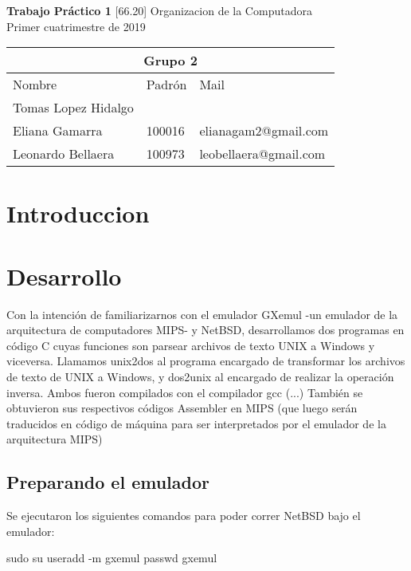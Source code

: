 \documentclass[titlepage,a4paper]{article}
\begin{document}
\begin{titlepage} %
    \centering
    \vfill
    \Huge \textbf{Trabajo Práctico 1}
    \vskip2cm
    \Large [66.20] Organizacion de la Computadora\\
    Primer cuatrimestre de 2019 
    \vskip2cm
    \begin{table}[htbp]
	\begin{center}
	\begin{tabular}{|l|l|l|}
	\hline
    \multicolumn{3}{|c|}{Grupo 2} \\ \hline
	Nombre & Padrón & Mail \\ \hline 
    Tomas Lopez Hidalgo & & \\ \hline 
    Eliana Gamarra & 100016 & elianagam2@gmail.com\\ \hline
    Leonardo Bellaera &  100973 & leobellaera@gmail.com \\ \hline
    \end{tabular}
	\label{tabla:sencilla}
	\end{center}
	\end{table}

    \vfill
\end{titlepage}
\tableofcontents %
\newpage

\section{Introduccion}\label{sec:intro}


\section{Desarrollo}\label{sec:intro}
Con la intención de familiarizarnos con el emulador GXemul -un emulador de la arquitectura de computadores MIPS- y NetBSD, desarrollamos dos programas en código C cuyas funciones son parsear archivos de texto UNIX a Windows y viceversa. Llamamos unix2dos al programa encargado de transformar los archivos de texto de UNIX a Windows, y dos2unix al encargado de realizar la operación inversa.
Ambos fueron compilados con el compilador gcc (...) %
También se obtuvieron sus respectivos códigos Assembler en MIPS (que luego serán traducidos en código de máquina para ser interpretados por el emulador de la arquitectura MIPS)

\subsection{Preparando el emulador}

Se ejecutaron los siguientes comandos para poder correr NetBSD bajo el emulador:

sudo su 
useradd -m gxemul
passwd gxemul
\end{document}
